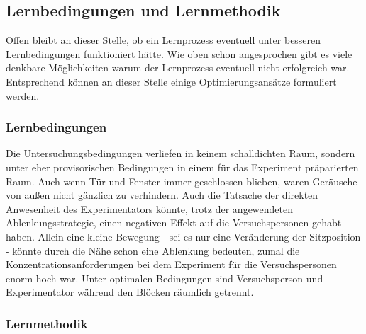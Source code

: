 \documentclass[doc,a4paper,12pt]{apa6}
\begin{document}
\subsection{Lernbedingungen und Lernmethodik}

Offen bleibt an dieser Stelle, ob ein Lernprozess eventuell unter besseren Lernbedingungen funktioniert hätte. Wie oben schon angesprochen gibt es viele denkbare Möglichkeiten warum der Lernprozess eventuell nicht erfolgreich war. Entsprechend können an dieser Stelle einige Optimierungsansätze formuliert werden.

\subsubsection{Lernbedingungen}

Die Untersuchungsbedingungen verliefen in keinem schalldichten Raum, sondern unter eher provisorischen Bedingungen in einem für das Experiment präparierten Raum. Auch wenn Tür und Fenster immer geschlossen blieben, waren Geräusche von außen nicht gänzlich zu verhindern. Auch die Tatsache der direkten Anwesenheit des Experimentators könnte, trotz der angewendeten Ablenkungsstrategie, einen negativen Effekt auf die Versuchspersonen gehabt haben. Allein eine kleine Bewegung - sei es nur eine Veränderung der Sitzposition - könnte durch die Nähe schon eine Ablenkung bedeuten, zumal die Konzentrationsanforderungen bei dem Experiment für die Versuchspersonen enorm hoch war. Unter optimalen Bedingungen sind Versuchsperson und Experimentator während den Blöcken räumlich getrennt.

\subsubsection{Lernmethodik}
\end{document}
